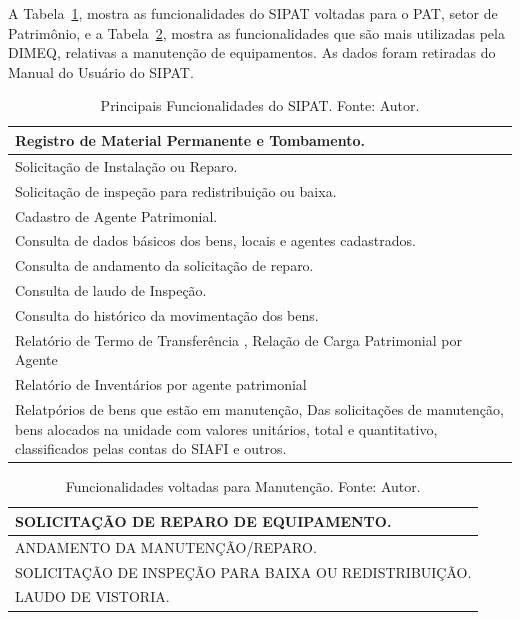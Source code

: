 A Tabela~\ref{sipat1}, mostra as funcionalidades do SIPAT voltadas para o PAT, setor de Patrimônio, e a Tabela~\ref{sipat2}, mostra as funcionalidades que são mais utilizadas pela DIMEQ, relativas a manutenção de equipamentos. As dados foram retiradas do Manual do Usuário do SIPAT. 


\begin{table}[H]
\centering
\caption{Principais Funcionalidades do SIPAT. Fonte: Autor.}
\label{sipat1}
\begin{tabular}{ | p{15cm} |}
\hline
	Registro de Material Permanente e Tombamento. \\ \hline
	Solicitação de Instalação ou Reparo. \\ \hline
	Solicitação de inspeção para redistribuição ou baixa. \\ \hline
	Cadastro de Agente Patrimonial. \\ \hline
	Consulta de dados básicos dos bens, locais e agentes cadastrados. \\ \hline
	Consulta de  andamento da solicitação de reparo. \\ \hline
	Consulta de laudo de Inspeção. \\ \hline
	Consulta do histórico da movimentação dos bens. \\ \hline
	Relatório de Termo de Transferência , Relação de Carga Patrimonial por Agente \\ \hline
	Relatório de Inventários por agente patrimonial \\ \hline
	Relatpórios de bens que estão em manutenção, Das solicitações de manutenção, bens alocados na unidade com valores unitários, total e quantitativo, classificados pelas contas do SIAFI e outros. \\ \hline
\end{tabular}
\end{table}

\begin{table}[H]
\centering
\caption{Funcionalidades voltadas para Manutenção. Fonte: Autor.}
\label{sipat2}
\begin{tabular}{ | p{15cm} |}
\hline
	SOLICITAÇÃO DE REPARO DE EQUIPAMENTO. \\ \hline
	ANDAMENTO DA MANUTENÇÃO/REPARO. \\ \hline
	SOLICITAÇÃO DE INSPEÇÃO PARA BAIXA OU REDISTRIBUIÇÃO. \\ \hline
	LAUDO DE VISTORIA.\\ \hline
\end{tabular}
\end{table}



